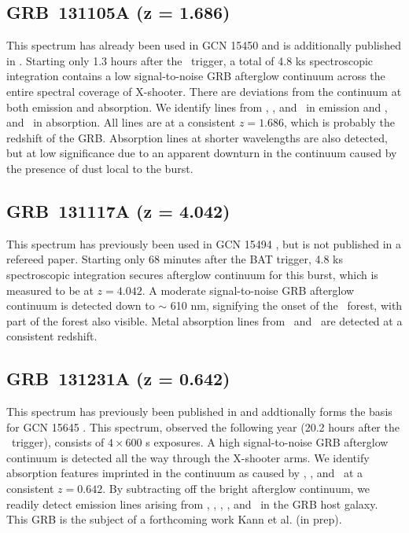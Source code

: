 \documentclass[longauth]{aa}    %
\begin{document}
\subsection{GRB~131105A (z = 1.686)}\label{131105}

This spectrum has already been used in GCN 15450 \citep{GCN15450} and is
additionally published in \citet{Kruhler2015}. Starting only 1.3 hours after the
\swift~trigger, a total of 4.8 ks spectroscopic integration contains a low
signal-to-noise GRB afterglow continuum across the entire spectral coverage of
X-shooter. There are deviations from the continuum at both emission and
absorption. We identify lines from \hb, \oiii, and \ha~in emission and \feii,
and \mgii~in absorption. All lines are at a consistent $z = 1.686$, which is
probably the redshift of the GRB. Absorption lines at shorter wavelengths are
also detected, but at low significance due to an apparent downturn in the
continuum caused by the presence of dust local to the burst.

\subsection{GRB~131117A (z = 4.042)}\label{131117}

This spectrum has previously been used in GCN 15494 \citep{GCN15494}, but is not
published in a refereed paper. Starting only 68 minutes after the BAT trigger,
4.8 ks spectroscopic integration secures afterglow continuum for this burst,
which is measured to be at $z = 4.042$. A moderate signal-to-noise GRB afterglow
continuum is detected down to $\sim$ 610 nm, signifying the onset of the
\lya~forest, with part of the forest also visible. Metal absorption lines from
\SIii~and \SIiv~are detected at a consistent redshift.

\subsection{GRB~131231A (z = 0.642)}\label{131231}

This spectrum has previously been published in \citet{Kruhler2015} and
addtionally forms the basis for GCN 15645 \citep{GCN15645}. This spectrum,
observed the following year (20.2 hours after the \swift~trigger), consists of
$4\times600$ s exposures. A high signal-to-noise GRB afterglow continuum is
detected all the way through the X-shooter arms. We identify absorption features
imprinted in the continuum as caused by \feii, \mgii, and \cahk~at a consistent
$z = 0.642$. By subtracting off the bright afterglow continuum, we readily
detect emission lines arising from \oii, \hg, \hb, \oiii, and \ha~in the GRB
host galaxy. This GRB is the subject of a forthcoming work Kann et al. (in
prep).
\end{document}

